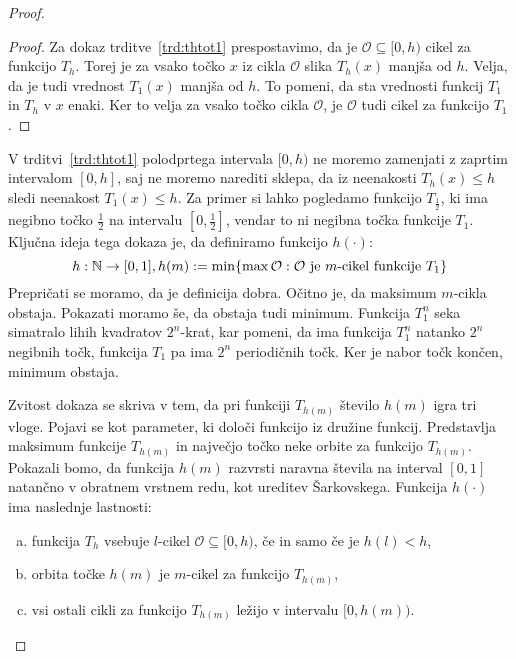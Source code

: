 \documentclass[../TG_magistrsko_delo_sections.tex]{subfiles}
\begin{document}
\begin{proof}
\begin{proof}
Za dokaz trditve~\ref{trd:thtot1} prespostavimo, da je $\mathcal{O} \subseteq [0, h)$ cikel za funkcijo $T_h$. Torej je za vsako točko $x$ iz cikla $\mathcal{O}$ slika $T_h(x)$ manjša od $h$. Velja, da je tudi vrednost $T_1(x)$ manjša od $h$. To pomeni, da sta vrednosti funkcij $T_1$ in $T_h$ v $x$ enaki. Ker to velja za vsako točko cikla $\mathcal{O}$, je $\mathcal{O}$ tudi cikel za funkcijo $T_1$.
\end{proof}
V trditvi~\ref{trd:thtot1} polodprtega intervala $[0, h)$ ne moremo zamenjati z zaprtim intervalom $[0, h]$, saj ne moremo narediti sklepa, da iz neenakosti $T_h(x) \leq h$ sledi neenakost $T_1(x) \leq h$. Za primer si lahko pogledamo funkcijo $T_{\frac{1}{2}}$, ki ima negibno točko $\frac{1}{2}$ na intervalu $[0, \frac{1}{2}]$, vendar to ni negibna točka funkcije $T_1$.
Ključna ideja tega dokaza je, da definiramo funkcijo $h(\cdot)$:
$$h: \mathbb N \to [0, 1], h(m) := \min\{\max \mathcal{O}: \mathcal{O}\text{ je }m\text{-cikel funkcije }T_1 \}$$
Prepričati se moramo, da je definicija dobra. Očitno je, da maksimum $m$-cikla obstaja. Pokazati moramo še, da obstaja tudi minimum. Funkcija $T_1^n$ seka simatralo lihih kvadratov $2^n$-krat, kar pomeni, da ima funkcija $T_1^n$ natanko $2^n$ negibnih točk, funkcija $T_1$ pa ima $2^n$ periodičnih točk. Ker je nabor točk končen, minimum obstaja.

Zvitost dokaza se skriva v tem, da pri funkciji $T_{h(m)}$ število $h(m)$ igra tri vloge. Pojavi se kot parameter, ki določi funkcijo iz družine funkcij. Predstavlja maksimum funkcije $T_{h(m)}$ in največjo točko neke orbite za funkcijo $T_{h(m)}$. Pokazali bomo, da funkcija $h(m)$ razvrsti naravna števila na interval $[0, 1]$ natančno v obratnem vrstnem redu, kot ureditev Šarkovskega.
Funkcija $h(\cdot)$ ima naslednje lastnosti:
\begin{enumerate}[(a)]
\item funkcija $T_h$  vsebuje $l$-cikel $\mathcal{O}\subseteq [0, h)$, če in samo če je $h(l)<h$,\label{l1}
\item orbita točke $h(m)$ je $m$-cikel za funkcijo $T_{h(m)}$,\label{l2}
\item vsi ostali cikli za funkcijo $T_{h(m)}$ ležijo v intervalu $[0, h(m)).$\label{l3}
\end{enumerate}


\end{proof}
\end{document}
